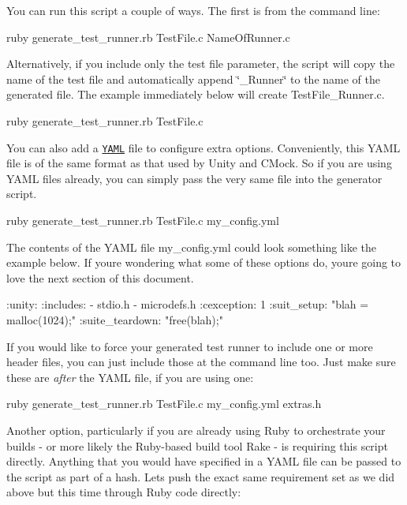You can run this script a couple of ways. The first is from the command line\+:


\begin{DoxyCode}
ruby generate\_test\_runner.rb TestFile.c NameOfRunner.c
\end{DoxyCode}


Alternatively, if you include only the test file parameter, the script will copy the name of the test file and automatically append \char`\"{}\+\_\+\+Runner\char`\"{} to the name of the generated file. The example immediately below will create Test\+File\+\_\+\+Runner.\+c.


\begin{DoxyCode}
ruby generate\_test\_runner.rb TestFile.c
\end{DoxyCode}


You can also add a \href{http://www.yaml.org/}{\tt Y\+A\+ML} file to configure extra options. Conveniently, this Y\+A\+ML file is of the same format as that used by Unity and C\+Mock. So if you are using Y\+A\+ML files already, you can simply pass the very same file into the generator script.


\begin{DoxyCode}
ruby generate\_test\_runner.rb TestFile.c my\_config.yml
\end{DoxyCode}


The contents of the Y\+A\+ML file {\ttfamily my\+\_\+config.\+yml} could look something like the example below. If you\textquotesingle{}re wondering what some of these options do, you\textquotesingle{}re going to love the next section of this document.


\begin{DoxyCode}
:unity:
  :includes:
    - stdio.h
    - microdefs.h
  :cexception: 1
  :suit\_setup: "blah = malloc(1024);"
  :suite\_teardown: "free(blah);"
\end{DoxyCode}


If you would like to force your generated test runner to include one or more header files, you can just include those at the command line too. Just make sure these are {\itshape after} the Y\+A\+ML file, if you are using one\+:


\begin{DoxyCode}
ruby generate\_test\_runner.rb TestFile.c my\_config.yml extras.h
\end{DoxyCode}


Another option, particularly if you are already using Ruby to orchestrate your builds -\/ or more likely the Ruby-\/based build tool Rake -\/ is requiring this script directly. Anything that you would have specified in a Y\+A\+ML file can be passed to the script as part of a hash. Let\textquotesingle{}s push the exact same requirement set as we did above but this time through Ruby code directly\+:


